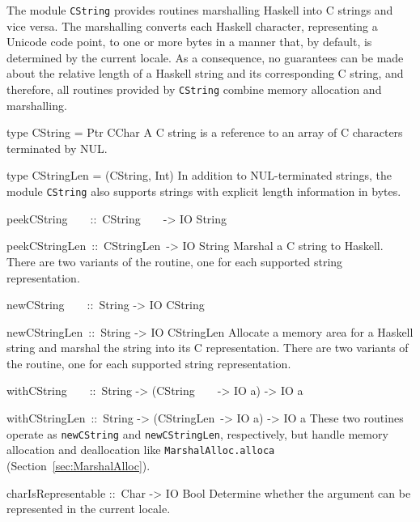 \documentclass[a4paper,twoside]{article}
\makeatletter
\newcommand{\code}[1]{\texttt{#1}}      %
\newenvironment{codedesc}{%
  \list{}{\labelwidth\z@
    \let\makelabel\codedesclabel}
  }{%
  \endlist
  }
\newcommand*{\codedesclabel}[1]{%
  \hspace{-\leftmargin}
  \parbox[b]{\labelwidth}{\makebox[0pt][l]{\code{#1}}\\}\hfil\relax
  }
\newcommand{\combineitems}{\vspace*{-\itemsep}\vspace*{-\parsep}\vspace*{-1em}}
\makeatother
\begin{document}
The module \code{CString} provides routines marshalling Haskell into C strings
and vice versa.  The marshalling converts each Haskell character, representing
a Unicode code point, to one or more bytes in a manner that, by default, is
determined by the current locale.  As a consequence, no guarantees can be made
about the relative length of a Haskell string and its corresponding C string,
and therefore, all routines provided by \code{CString} combine memory
allocation and marshalling.
%
\begin{codedesc}
\item[type CString = Ptr CChar] A C string is a reference to an array of C
  characters terminated by NUL.

\item[type CStringLen = (CString, Int)] In addition to NUL-terminated strings,
  the module \code{CString} also supports strings with explicit length
  information in bytes. 

\item[peekCString~~~~::\ CString~~~~-> IO String]
\item[peekCStringLen~::\ CStringLen~-> IO String]\combineitems
  Marshal a C string to Haskell.  There are two variants of the routine, one
  for each supported string representation.

\item[newCString~~~~::\ String -> IO CString]
\item[newCStringLen~::\ String -> IO CStringLen] \combineitems Allocate a
  memory area for a Haskell string and marshal the string into its C
  representation.  There are two variants of the routine, one for each
  supported string representation.

\item[withCString~~~~::\ String -> (CString~~~~-> IO a) -> IO a]
\item[withCStringLen~::\ String -> (CStringLen~-> IO a) -> IO a] \combineitems
  These two routines operate as \code{newCString} and \code{newCStringLen},
  respectively, but handle memory allocation and deallocation like
  \code{MarshalAlloc.alloca} (Section~\ref{sec:MarshalAlloc}).
  
\item[charIsRepresentable ::\ Char -> IO Bool] Determine whether the argument
  can be represented in the current locale.

\end{codedesc}
\end{document}
